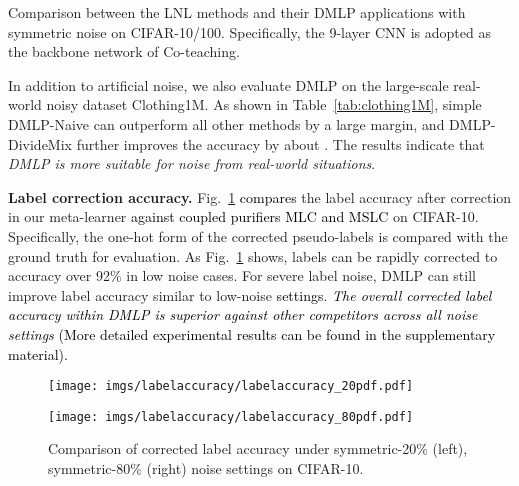\documentclass[10pt,twocolumn,letterpaper]{article}
\newcommand{\zbs}[1]{\textcolor{black}{#1}}
\newcommand{\zbsN}[1]{\textcolor{black}{#1}}
\begin{document}
\begin{table*}[!t]
\footnotesize
    \centering
    \caption{
    Comparison between the LNL methods and their DMLP applications with symmetric noise on CIFAR-10/100. Specifically, the 9-layer CNN is adopted as the backbone network of Co-teaching.}
    \vspace{-1em}
    \setlength\tabcolsep{10pt}
    \resizebox{0.8\textwidth}{!}{}
    \label{tab:cifar10_sym_compare}
\end{table*}


In addition to artificial noise, we also evaluate DMLP on the large-scale real-world noisy dataset Clothing1M. As shown in Table~\ref{tab:clothing1M}, {simple DMLP-Naive can} outperform all other methods by a large margin, {and DMLP-DivideMix further improves the accuracy by about }. The results indicate that \emph{DMLP is more suitable for noise from real-world situations}. 


 \textbf{Label correction accuracy.} Fig.~\ref{fig:corrected_label} \zbs{compares} the label accuracy {after correction in our meta-learner} \zbs{against coupled purifiers MLC and MSLC} on CIFAR-10. Specifically, the one-hot form of the corrected pseudo-labels is {compared} with the ground truth {for evaluation}. As Fig.~\ref{fig:corrected_label} shows, labels can be rapidly corrected to {accuracy} over 92\% in low noise cases. For severe label noise, DMLP can still improve label accuracy similar {to} low-noise \zbsN{settings}.
\zbs{\emph{The overall corrected label accuracy within DMLP is superior against other competitors across all noise settings} (More detailed experimental results can be found in the supplementary material). } 
\begin{figure}[!t]
 \centering
\small
 \begin{minipage}{0.236\textwidth}
    \centering
    \texttt{[image: imgs/labelaccuracy/labelaccuracy\_20pdf.pdf]}
\end{minipage}
 \begin{minipage}{0.236\textwidth}
    \centering
    \texttt{[image: imgs/labelaccuracy/labelaccuracy\_80pdf.pdf]}   
\end{minipage}
\vspace{-1em}
  \caption
    {
    \small
        Comparison of corrected label accuracy under symmetric-20\% (left), symmetric-80\% (right) noise settings on CIFAR-10. }
  \label{fig:corrected_label}
  \vspace{-2mm}
 \end{figure}
\end{document}
